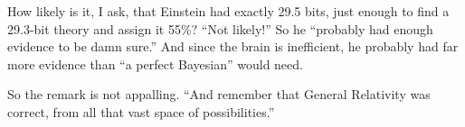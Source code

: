 How likely is it, I ask, that Einstein had exactly 29.5 bits, just enough to find a 29.3-bit theory and assign it 55\%? ``Not likely!'' So he ``probably had enough evidence to be damn sure.''  And since the brain is inefficient, he probably had far more evidence than ``a perfect Bayesian'' would need. 

So the remark is not appalling. ``And remember that General Relativity was correct, from all that vast space of possibilities.''
